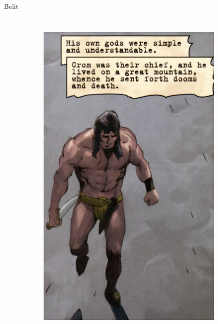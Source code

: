 \begin{frame}{Belit}
\begin{columns}
\begin{figure}[htp]
\begin{subfigure}[b]{0.27\textwidth}
				\includegraphics[width=\textwidth]{img/conan/DH}
			\end{subfigure}
			~
			\begin{subfigure}[b]{0.23\textwidth}

\end{subfigure}
\end{figure}
\end{columns}
\end{frame}
